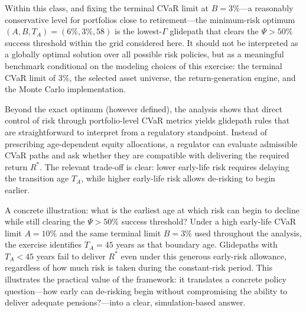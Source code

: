 \documentclass[11pt]{article}
\begin{document}
Within this class, and fixing the terminal CVaR limit at $B=3\%$---a 
reasonably conservative level for portfolios close to retirement---the 
minimum-risk optimum $(A,B,T_A)=(6\%,3\%,58)$ is the lowest-$\Gamma$ 
glidepath that clears the $\Psi > 50\%$ success threshold within the grid 
considered here. It should not be interpreted as a globally optimal solution 
over all possible risk policies, but as a meaningful benchmark conditional 
on the modeling choices of this exercise: the terminal CVaR limit of $3\%$, 
the selected asset universe, the return-generation engine, and the Monte 
Carlo implementation.

Beyond the exact optimum (however defined), the analysis shows that direct 
control of risk through portfolio-level CVaR metrics yields glidepath rules 
that are straightforward to interpret from a regulatory standpoint. Instead 
of prescribing age-dependent equity allocations, a regulator can evaluate 
admissible CVaR paths and ask whether they are compatible with delivering 
the required return $R^*$. The relevant trade-off is clear: lower early-life 
risk requires delaying the transition age $T_A$, while higher early-life risk 
allows de-risking to begin earlier.

A concrete illustration: what is the earliest age at which risk can begin to 
decline while still clearing the $\Psi > 50\%$ success threshold? Under a 
high early-life CVaR limit $A=10\%$ and the same terminal limit $B=3\%$ used 
throughout the analysis, the exercise identifies $T_A=45$ years as that boundary 
age. Glidepaths with $T_A < 45$ years fail to deliver $R^*$ even under this 
generous early-risk allowance, regardless of how much risk is taken during 
the constant-risk period. This illustrates the practical value of the 
framework: it translates a concrete policy question---how early can de-risking 
begin without compromising the ability to deliver adequate pensions?---into 
a clear, simulation-based answer.
\end{document}
